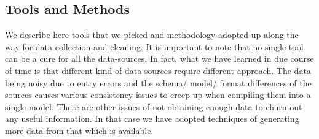 \subsection{Tools and Methods}

We describe here tools that we picked and methodology adopted up along the way for data collection and cleaning. It is important to note that no single tool can be a cure for all the data-sources. In fact, what we have learned in due course of time is that different kind of data sources require different approach.
The data being noisy due to entry errors and the schema/ model/ format differences of the sources causes various consistency issues to creep up when compiling them into a single model.
There are other issues of not obtaining enough data to churn out any useful information. In that case we have adopted techniques of generating more data from that which is available.

